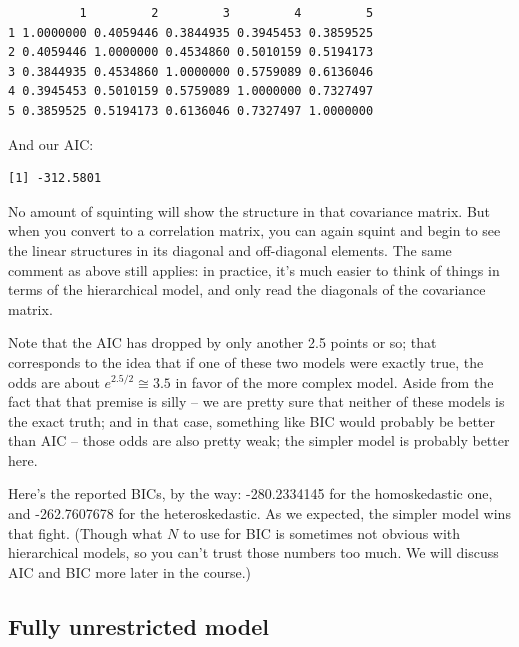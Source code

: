 \documentclass[
  letterpaper,
  DIV=11,
  numbers=noendperiod]{scrreprt}
\newenvironment{Shaded}{\begin{snugshade}}{\end{snugshade}}
\newcommand{\FunctionTok}[1]{\textcolor[rgb]{0.02,0.16,0.49}{#1}}
\newcommand{\NormalTok}[1]{\textcolor[rgb]{0.00,0.44,0.13}{#1}}
\newcommand{\SpecialCharTok}[1]{\textcolor[rgb]{0.25,0.44,0.63}{#1}}
\begin{document}
\begin{verbatim}
          1         2         3         4         5
1 1.0000000 0.4059446 0.3844935 0.3945453 0.3859525
2 0.4059446 1.0000000 0.4534860 0.5010159 0.5194173
3 0.3844935 0.4534860 1.0000000 0.5759089 0.6136046
4 0.3945453 0.5010159 0.5759089 1.0000000 0.7327497
5 0.3859525 0.5194173 0.6136046 0.7327497 1.0000000
\end{verbatim}

And our AIC:

\begin{Shaded}
\end{Shaded}

\begin{verbatim}
[1] -312.5801
\end{verbatim}

No amount of squinting will show the structure in that covariance
matrix. But when you convert to a correlation matrix, you can again
squint and begin to see the linear structures in its diagonal and
off-diagonal elements. The same comment as above still applies: in
practice, it's much easier to think of things in terms of the
hierarchical model, and only read the diagonals of the covariance
matrix.

Note that the AIC has dropped by only another 2.5 points or so; that
corresponds to the idea that if one of these two models were exactly
true, the odds are about \(e^{2.5/2}\cong 3.5\) in favor of the more
complex model. Aside from the fact that that premise is silly -- we are
pretty sure that neither of these models is the exact truth; and in that
case, something like BIC would probably be better than AIC -- those odds
are also pretty weak; the simpler model is probably better here.

Here's the reported BICs, by the way: -280.2334145 for the homoskedastic
one, and -262.7607678 for the heteroskedastic. As we expected, the
simpler model wins that fight. (Though what \(N\) to use for BIC is
sometimes not obvious with hierarchical models, so you can't trust those
numbers too much. We will discuss AIC and BIC more later in the course.)

\hypertarget{fully-unrestricted-model}{%
\subsection{Fully unrestricted model}\label{fully-unrestricted-model}}
\end{document}
